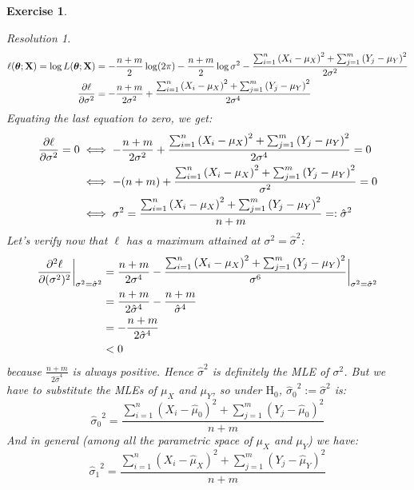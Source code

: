 \documentclass[10pt,a4paper]{article}
\newcommand{\vf}[1]{\boldsymbol{\mathrm{#1}}} %
\theoremstyle{plain}
\newtheorem{exercice}{Exercise}
\theoremstyle{remark}
\newtheorem*{resolution}{Resolution}
\begin{document}
\begin{exercice}
\begin{enumerate}
\begin{resolution}
            \begin{align*}
              \ell(\vf\theta;\vf{X})=\log L(\vf\theta;\vf{X}) & =-\frac{n+m}{2}\log(2\pi)-\frac{n+m}{2}\log\sigma^2-\frac{\sum_{i=1}^n{(X_i-\mu_X)}^2+\sum_{j=1}^m{(Y_j-\mu_Y)}^2}{2\sigma^2} \\
              \pdv{\ell}{\sigma^2}(\vf\theta;\vf{X})          & =-\frac{n+m}{2\sigma^2}+\frac{\sum_{i=1}^n{(X_i-\mu_X)}^2+\sum_{j=1}^m{(Y_j-\mu_Y)}^2}{2\sigma^4}
            \end{align*}
            Equating the last equation to zero, we get:
            \begin{align*}
              \pdv{\ell}{\sigma^2}(\vf\theta;\vf{X})=0 & \iff -\frac{n+m}{2\sigma^2}+\frac{\sum_{i=1}^n{(X_i-\mu_X)}^2+\sum_{j=1}^m{(Y_j-\mu_Y)}^2}{2\sigma^4}= 0 \\
                                                       & \iff  -(n+m)+\frac{\sum_{i=1}^n{(X_i-\mu_X)}^2+\sum_{j=1}^m{(Y_j-\mu_Y)}^2}{\sigma^2}= 0                 \\
                                                       & \iff \sigma^2=\frac{\sum_{i=1}^n{(X_i-\mu_X)}^2+\sum_{j=1}^m{(Y_j-\mu_Y)}^2}{n+m}=:{\hat\sigma}^2
            \end{align*}
            Let's verify now that $\ell$ has a maximum attained at $\sigma^2={\hat\sigma}^2$:
            \begin{align*}
              \pdv[2]{\ell}{(\sigma^2)}(\vf\theta;\vf{X})\bigg|_{\sigma^2={\hat\sigma}^2} & =\frac{n+m}{2\sigma^4}-\frac{\sum_{i=1}^n{(X_i-\mu_X)}^2+\sum_{j=1}^m{(Y_j-\mu_Y)}^2}{\sigma^6}\bigg|_{\sigma^2={\hat\sigma}^2} \\
                                                                                          & =\frac{n+m}{2{\hat\sigma}^4}-\frac{n+m}{{\hat\sigma}^4}                                                                         \\
                                                                                          & =-\frac{n+m}{2{\hat\sigma}^4}                                                                                                   \\
                                                                                          & <0
            \end{align*}
            because $\frac{n+m}{2{\hat\sigma}^4}$ is always positive. Hence ${\hat\sigma}^2$ is definitely the MLE of $\sigma^2$. But we have to substitute the MLEs of $\mu_X$ and $\mu_Y$, so under $\text{H}_0$, ${\hat\sigma_0}^2:=\hat\sigma^2$ is: $${\hat\sigma_0}^2=\frac{\sum_{i=1}^n{(X_i-\hat\mu_0)}^2+\sum_{j=1}^m{(Y_j-\hat\mu_0)}^2}{n+m}$$ And in general (among all the parametric space of $\mu_X$ and $\mu_Y$) we have: $${\hat\sigma_1}^2=\frac{\sum_{i=1}^n{(X_i-\hat\mu_X)}^2+\sum_{j=1}^m{(Y_j-\hat\mu_Y)}^2}{n+m}$$

\end{resolution}
\end{enumerate}
\end{exercice}
\end{document}
